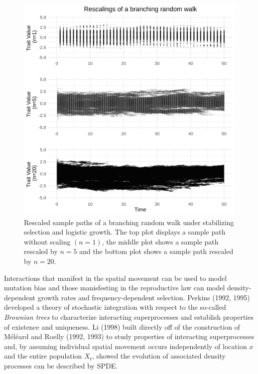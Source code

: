 \documentclass[]{article}
\begin{document}
\begin{figure}

{\centering \includegraphics[width=29.17in]{rescaled_plots} 

}

\caption{\label{rescaled}Rescaled sample paths of a branching random walk under stabilizing selection and logistic growth. The top plot displays a sample path without scaling $(n=1)$, the middle plot shows a sample path rescaled by $n=5$ and the bottom plot shows a sample path rescaled by $n=20$.}\label{fig:unnamed-chunk-4}
\end{figure}

Interactions that manifest in the spatial movement can be used to model
mutation bias and those manisfesting in the reproductive law can model
density-dependent growth rates and frequency-dependent selection.
Perkins (1992, 1995) developed a theory of stochastic integration with
respect to the so-called \emph{Brownian trees} to characterize
interacting superprocesses and establish properties of existence and
uniqueness. Li (1998) built directly off of the construction of Méléard
and Roelly (1992, 1993) to study properties of interacting
superprocesses and, by assuming individual spatial movement occurs
independently of location \(x\) and the entire population \(X_t\),
showed the evolution of associated density processes can be described by
SPDE.
\end{document}
